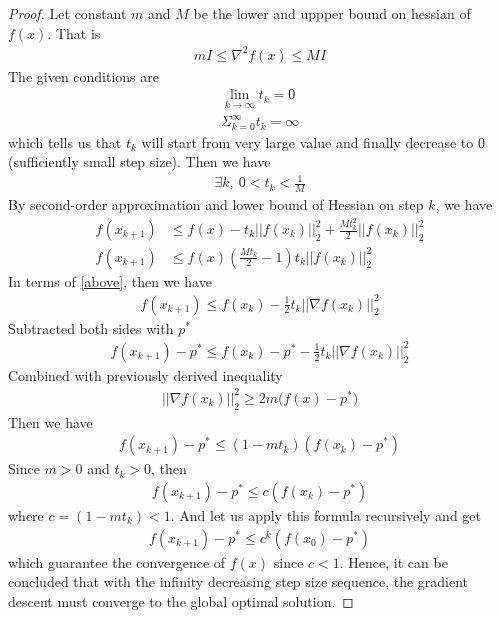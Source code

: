 \documentclass[11pt,a4paper]{article}
\begin{document}
\begin{proof}
    Let constant $m$ and $M$ be the lower and uppper bound on hessian of
    $f(x)$. That is 
    \begin{align}
        mI \leq \nabla^2 f(x) \leq MI
    \end{align}
    The given conditions are 
    \begin{align}
        \lim_{k\rightarrow \infty} t_k  = 0 \\
        \Sigma_{k=0}^{\infty} t_k = \infty
    \end{align}
    which tells us that $t_k$ will start from very large value and finally
    decrease to 0 (sufficiently small step size). Then we have 
    \begin{align}
        \exists k,\ 0 < t_k < \frac{1}{M} \label{above}
    \end{align}
    By second-order approximation and lower bound of Hessian on step $k$, we have 
    \begin{align}
        f(x_{k+1}) &\leq f(x) - t_k || f(x_k) ||_2^2 + \frac{Mt_k^2}{2} ||
        f(x_k) ||_2^2 \\
        f(x_{k+1}) &\leq f(x) (\frac{Mt_k}{2} - 1) t_k || f(x_k) ||_2^2 
    \end{align}
    In terms of \eqref{above}, then we have 
    \begin{align}
        f(x_{k+1}) \leq f(x_k) - \frac{1}{2} t_k || \nabla f(x_k) ||_2^2
    \end{align}
    Subtracted both sides with $p^*$
    \begin{align}
        f(x_{k+1}) - p^* \leq f(x_k) - p^* - \frac{1}{2} t_k || \nabla f(x_k) ||_2^2
    \end{align}
    Combined with previously derived inequality 
    \begin{align}
        || \nabla f(x_k) ||_2^2  \geq 2m \big( f(x) - p^* \big)
    \end{align}
    Then we have 
    \begin{align}
        f(x_{k+1}) - p^* \leq (1- m t_k ) (f(x_k) - p^*)  
    \end{align}
    Since $ m > 0 $ and $t_k > 0$, then 
    \begin{align}
        f(x_{k+1}) - p^* \leq c (f(x_k) - p^*)  
    \end{align}
    where $c = (1- m t_k ) < 1$. And let us apply this formula recursively
    and get
    \begin{align}
        f(x_{k+1}) - p^* \leq c^k (f(x_0) - p^*)  
    \end{align}
    which guarantee the convergence of $f(x)$ since $c < 1$.
    Hence, it can be concluded that with the
    infinity decreasing step size sequence, the gradient descent must converge to
    the global optimal solution. 
\end{proof}
\end{document}
